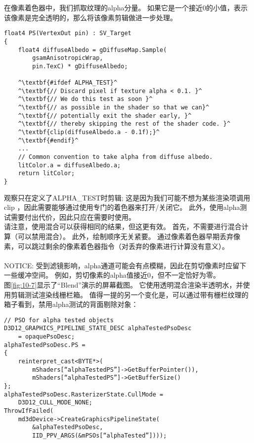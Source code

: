 \begin{flushleft}
在像素着色器中，我们抓取纹理的alpha分量。 如果它是一个接近0的小值，表示该像素是完全透明的，那么将该像素剪辑做进一步处理。
\end{flushleft}

\begin{lstlisting}[escapechar=^]
float4 PS(VertexOut pin) : SV_Target
{
    float4 diffuseAlbedo = gDiffuseMap.Sample(
        gsamAnisotropicWrap, 
        pin.TexC) * gDiffuseAlbedo;

    ^\textbf{#ifdef ALPHA_TEST}^
    ^\textbf{// Discard pixel if texture alpha < 0.1. }^
    ^\textbf{// We do this test as soon }^
    ^\textbf{// as possible in the shader so that we can}^
    ^\textbf{// potentially exit the shader early, }^
    ^\textbf{// thereby skipping the rest of the shader code. }^
    ^\textbf{clip(diffuseAlbedo.a - 0.1f);}^
    ^\textbf{#endif}^
    ...
    // Common convention to take alpha from diffuse albedo.
    litColor.a = diffuseAlbedo.a;
    return litColor;
}
\end{lstlisting}

\begin{flushleft}
观察只在定义了ALPHA\_TEST时剪辑; 这是因为我们可能不想为某些渲染项调用 clip ，因此需要能够通过使用专门的着色器来打开/关闭它。 此外，使用alpha测试需要付出代价，因此只应在需要时使用。\\

请注意，使用混合可以获得相同的结果，但这更有效。 首先，不需要进行混合计算（可以禁用混合）。 此外，绘制顺序无关紧要。 通过像素着色器早期丢弃像素，可以跳过剩余的像素着色器指令（对丢弃的像素进行计算没有意义）。\\
~\\
NOTICE: 受到滤镜影响，alpha通道可能会有点模糊，因此在剪切像素时应留下一些缓冲空间。 例如，剪切像素的alpha值接近0，但不一定恰好为零。
~\\

图\ref{fig:10-7}显示了“Blend”演示的屏幕截图。 它使用透明混合渲染半透明水，并使用剪辑测试渲染线栅栏箱。 值得一提的另一个变化是，可以通过带有栅栏纹理的箱子看到，禁用alpha测试的背面剔除对象：\\
\end{flushleft}

\begin{lstlisting}
// PSO for alpha tested objects
D3D12_GRAPHICS_PIPELINE_STATE_DESC alphaTestedPsoDesc
    = opaquePsoDesc;
alphaTestedPsoDesc.PS =
{
    reinterpret_cast<BYTE*>(
        mShaders[“alphaTestedPS”]->GetBufferPointer()),
        mShaders[“alphaTestedPS”]->GetBufferSize()
};
alphaTestedPsoDesc.RasterizerState.CullMode =
    D3D12_CULL_MODE_NONE;
ThrowIfFailed(
    md3dDevice->CreateGraphicsPipelineState(
        &alphaTestedPsoDesc,
        IID_PPV_ARGS(&mPSOs[“alphaTested”])));
\end{lstlisting}

